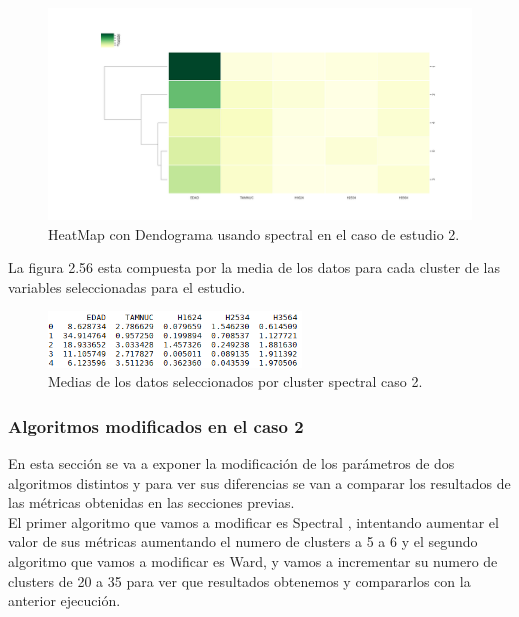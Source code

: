 	\begin{figure}[htb]
		\centering
		\includegraphics[width=1.0\textwidth]{./imagenes/caso2/heatmapcondendograma_caso2_spectral}
		\caption{HeatMap con Dendograma usando spectral en el caso de estudio 2.} \label{fig:1}
	\end{figure}

	La figura 2.56 esta compuesta por la media de los datos para cada cluster de las variables seleccionadas
	para el estudio. \\ 

	\begin{figure}[htb]
		\centering
		\includegraphics[width=0.6\textwidth]{./imagenes/caso2/medias_datos_caso2_spectral}
		\caption{Medias de los datos seleccionados por cluster spectral caso 2.} \label{fig:1}
	\end{figure}


	\subsubsection[Algoritmos modificados en el caso 2]{Algoritmos modificados en el caso 2}

	En esta sección se va a exponer la modificación de los parámetros de dos algoritmos distintos y para ver sus diferencias
	se van a comparar los resultados de las métricas obtenidas en las secciones previas. \\

	El primer algoritmo que vamos a modificar es Spectral , intentando 
	aumentar el valor de sus métricas aumentando el numero de clusters a 5 a 6 y el segundo algoritmo que vamos a modificar es Ward, 
	y vamos a incrementar su numero de clusters de 20 a 35
	para ver que resultados obtenemos y compararlos con la anterior ejecución. \\

